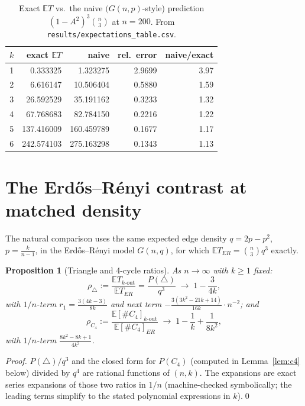 \documentclass[11pt,a4paper]{article}
\newtheorem{proposition}[theorem]{Proposition}
\theoremstyle{definition}
\theoremstyle{definition}
\begin{document}
\begin{table}[t]
\centering
\caption{Exact $\mathbb E T$ vs.\ the naive $(G(n,p)$-style) prediction
$(1-A^{2})^{3}\binom{n}{3}$ at $n=200$. From \texttt{results/expectations\_table.csv}.}
\label{tab:naive}
\begin{tabular}{rrrrr}
\toprule
$k$ & exact $\mathbb ET$ & naive & rel.\ error & naive/exact\\
\midrule
1 & 0.333325 & 1.323275 & 2.9699 & 3.97\\
2 & 6.616147 & 10.506404 & 0.5880 & 1.59\\
3 & 26.592529 & 35.191162 & 0.3233 & 1.32\\
4 & 67.768683 & 82.784150 & 0.2216 & 1.22\\
5 & 137.416009 & 160.459789 & 0.1677 & 1.17\\
6 & 242.574103 & 275.163298 & 0.1343 & 1.13\\
\bottomrule
\end{tabular}
\end{table}

\section{The Erd\H os--R\'enyi contrast at matched density}\label{sec:er}

The natural comparison uses the same expected edge density
$q=2p-p^{2}$, $p=\tfrac{k}{n-1}$, in the Erd\H os--R\'enyi model
$G(n,q)$, for which $\mathbb E T_{ER} = \binom{n}{3}q^{3}$ exactly.

\begin{proposition}[Triangle and 4-cycle ratios]\label{prop:er}
As $n\to\infty$ with $k\ge 1$ fixed:
\[
\rho_\triangle:=\frac{\mathbb E T_{k\text{-out}}}{\mathbb E T_{ER}}
= \frac{P(\triangle)}{q^{3}}
\;\longrightarrow\; 1-\frac{3}{4k},
\]
with $1/n$-term $r_1=\frac{3(4k-3)}{8k}$ and next term
$-\frac{3(3k^{2}-21k+14)}{16k}\cdot n^{-2}$; and
\[
\rho_{C_4}:=\frac{\mathbb E[\#C_4]_{k\text{-out}}}{\mathbb E[\#C_4]_{ER}}
\;\longrightarrow\;1-\frac{1}{k}+\frac{1}{8k^{2}},
\]
with $1/n$-term $\frac{8k^{2}-8k+1}{4k^{2}}$.
\end{proposition}

\begin{proof}
$P(\triangle)/q^{3}$ and the closed form for $P(C_4)$
(computed in Lemma~\ref{lem:c4} below) divided by $q^{4}$ are rational functions of
$(n,k)$. The expansions are exact series expansions of those two ratios in $1/n$
(machine-checked symbolically; the leading terms simplify to the stated
polynomial expressions in $k$).\qed
\end{proof}
\end{document}
